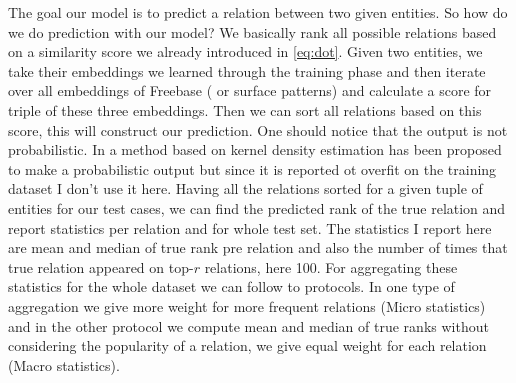 The goal our model is to predict a relation between
two given entities. So how do we do prediction with our model? We basically rank
all possible relations based on a similarity score we already introduced in
\eqref{eq:dot}. Given two entities, we take their embeddings we learned through
the training phase and then iterate over all embeddings of Freebase ( or
surface patterns) and calculate a score for triple of these three embeddings.
Then we can sort all relations based on this score, this will construct our
prediction. One should notice that the output is not probabilistic. In
\cite{Bordes2011} a method based on kernel density estimation has been proposed
to make a probabilistic output but since it is reported ot overfit on the
training dataset I don't use it here. 
Having all the relations sorted for a given tuple of entities for our test
cases, we can find the predicted rank of the true relation and report statistics
per relation and for whole test set. The statistics I report here are mean and
median of true rank pre relation and also the number of times that true relation
appeared on top-$r$ relations, here 100. For aggregating these statistics for
the whole dataset we can follow to protocols. In one type of aggregation we
give more weight for more frequent relations (Micro statistics) and in the other
protocol we compute mean and median of true ranks without considering the
popularity of a relation, we give equal weight for each relation (Macro
statistics).

